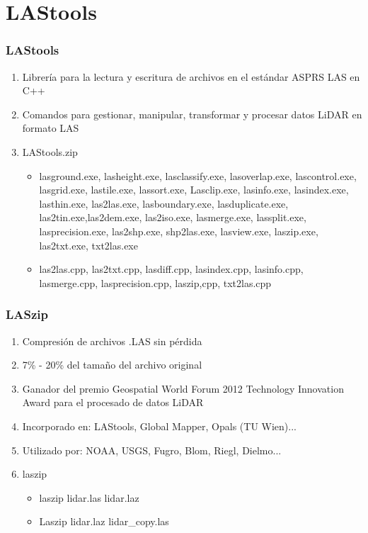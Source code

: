 \section{LAStools}
\begin{frame}
  \frametitle{LAStools}
  \begin{enumerate}
    \item Librería para la \alert{lectura} y \alert{escritura} de archivos en el
      estándar ASPRS LAS en C++
    \item Comandos para gestionar, manipular, transformar y procesar datos LiDAR
      en formato LAS
    \item \alert{LAStools.zip}
      \begin{itemize}
        \item lasground.exe, lasheight.exe, lasclassify.exe, lasoverlap.exe,
          lascontrol.exe, lasgrid.exe, lastile.exe, lassort.exe, Lasclip.exe,
          lasinfo.exe, lasindex.exe, lasthin.exe, las2las.exe, lasboundary.exe,
          lasduplicate.exe, las2tin.exe,las2dem.exe, las2iso.exe, lasmerge.exe,
          lassplit.exe, lasprecision.exe, las2shp.exe, shp2las.exe, lasview.exe,
          laszip.exe, las2txt.exe, txt2las.exe
        \item las2las.cpp, las2txt.cpp, lasdiff.cpp, lasindex.cpp, lasinfo.cpp,
          lasmerge.cpp, lasprecision.cpp, laszip,cpp, txt2las.cpp
      \end{itemize}
  \end{enumerate}
\end{frame}
\begin{frame}
  \frametitle{LASzip}
  \begin{enumerate}
    \item Compresión de archivos .LAS sin \alert{pérdida}
    \item 7\% - 20\% del tamaño del archivo original
    \item Ganador del premio Geospatial World Forum 2012 Technology 
      Innovation Award para el procesado de datos LiDAR
    \item Incorporado en: LAStools, Global Mapper, Opals (TU Wien)...
    \item Utilizado por: NOAA, USGS, Fugro, Blom, Riegl, Dielmo...
    \item \alert{laszip}
      \begin{itemize}
        \item laszip lidar.las lidar.laz
        \item Laszip lidar.laz lidar\_copy.las
      \end{itemize}
  \end{enumerate}
\end{frame}

